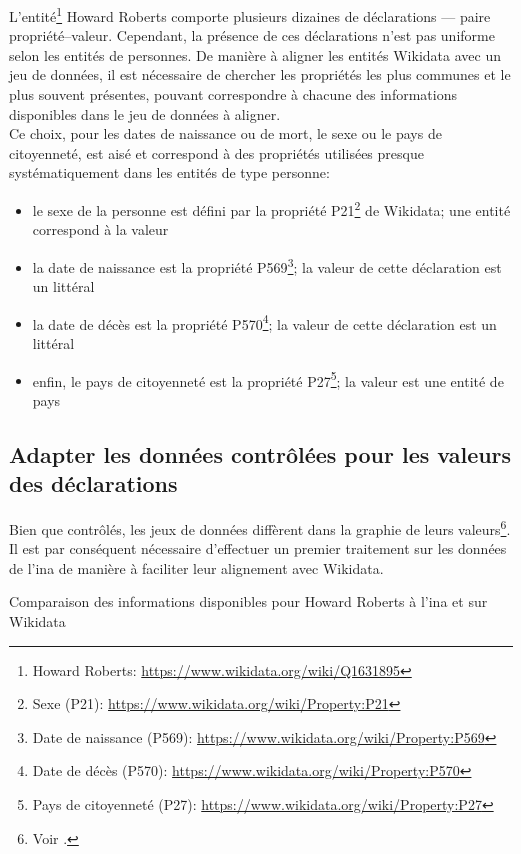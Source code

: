 L'entité\footnote{Howard Roberts: \url{https://www.wikidata.org/wiki/Q1631895}} Howard Roberts comporte plusieurs dizaines de déclarations --- paire propriété--valeur. Cependant, la présence de ces déclarations n'est pas uniforme selon les entités de personnes. De manière à aligner les entités Wikidata avec un jeu de données, il est nécessaire de chercher les propriétés les plus communes et le plus souvent présentes, pouvant correspondre à chacune des informations disponibles dans le jeu de données à aligner.\\

Ce choix, pour les dates de naissance ou de mort, le sexe ou le pays de citoyenneté, est aisé et correspond à des propriétés utilisées presque systématiquement dans les entités de type personne:
\begin{itemize}
	\item le sexe de la personne est défini par la propriété P21\footnote{Sexe (P21): \url{https://www.wikidata.org/wiki/Property:P21}} de Wikidata; une entité correspond à la valeur
	\item la date de naissance est la propriété P569\footnote{Date de naissance (P569): \url{https://www.wikidata.org/wiki/Property:P569}}; la valeur de cette déclaration est un littéral
	\item la date de décès est la propriété P570\footnote{Date de décès (P570): \url{https://www.wikidata.org/wiki/Property:P570}}; la valeur de cette déclaration est un littéral
	\item enfin, le pays de citoyenneté est la propriété P27\footnote{Pays de citoyenneté (P27): \url{https://www.wikidata.org/wiki/Property:P27}}; la valeur est une entité de pays
\end{itemize} 

\subsection{\label{II-C-2-b} Adapter les données contrôlées pour les valeurs des déclarations}

Bien que contrôlés, les jeux de données diffèrent dans la graphie de leurs valeurs\footnote{Voir .}. Il est par conséquent nécessaire d'effectuer un premier traitement sur les données de l'\ac{ina} de manière à faciliter leur alignement avec Wikidata.
\begin{table}[h!]
	\centering
	\caption{Comparaison des informations disponibles pour Howard Roberts à l'\ac{ina} et sur Wikidata}
	\label{table_roberts_2}
\end{table}


